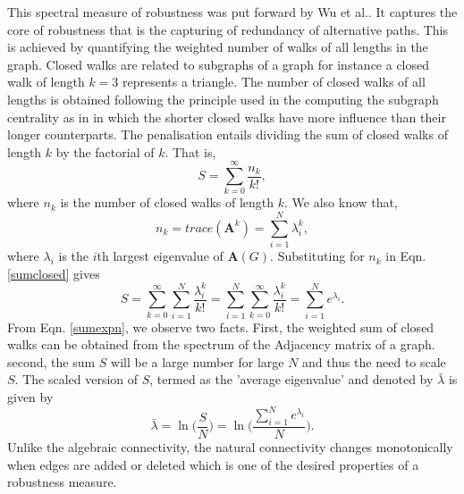 \documentclass[10pt,a4paper]{article}
\begin{document}
\begin{enumerate}
		This spectral measure of robustness was put forward by Wu et al.\citep{wu2564spectral}. It captures the core of robustness that is the capturing of redundancy of alternative paths. This is achieved by quantifying the weighted number of walks of all lengths in the graph. Closed walks are related to subgraphs of a graph for instance a closed walk of length $k=3$ represents a triangle. The number of closed walks of all lengths is obtained following the principle used in the computing the subgraph centrality as in \citep{estrada2011structure} in which the shorter closed walks have more influence than their longer counterparts. The penalisation entails dividing the sum of closed walks of length $k$ by the factorial of $k$. That is,  
		\begin{equation}
		S = \sum_{k=0}^{\infty} \frac{n_k}{k!},
		\label{sumclosed}
		\end{equation} 
		where $n_k$ is the number of closed walks of length $k$. We also know that,
		\begin{equation}
		n_k = trace(\mathbf{A}^k) = \sum_{i=1}^{N} \lambda_{i} ^k,
		\end{equation}
		where $\lambda_i$ is the $i$th largest eigenvalue of $\mathbf{A}(G)$.
		Substituting for $n_k$ in Eqn.\ref{sumclosed} gives
		\begin{equation}
		S = \sum_{k=0}^{\infty} \sum_{i=1}^{N} \frac{\lambda_{i} ^k} {k!} =  \sum_{i=1}^{N}\sum_{k=0}^{\infty} \frac{\lambda_{i} ^k} {k!}= \sum_{i=1}^{N} e^{\lambda_i}.
		\label{sumexpn}
		\end{equation}
		From Eqn. \ref{sumexpn}, we observe two facts. First, the weighted sum of closed walks can be obtained from the spectrum of the Adjacency matrix of a graph. second, the sum $S$ will be a large number for large $N$ and  thus the need to scale $S$. The scaled version of $S$, termed as the 'average eigenvalue' and denoted by $\bar{\lambda}$  is given by
		\begin{equation}
		\bar{\lambda} = \ln \big( \frac{S}{N}\big) = \ln \Big( \frac{\sum_{i=1}^{N} e^{\lambda_i}}{N} \Big).
		\end{equation}
		Unlike the algebraic connectivity, the natural connectivity changes monotonically when edges are added or deleted which is one of the desired properties of a robustness measure.
	\end{enumerate}
\end{document}
